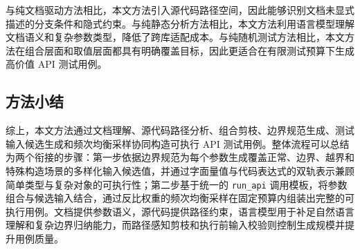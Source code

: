 \documentclass[UTF8,fontset=fandol]{ctexart}
\begin{document}
与纯文档驱动方法相比，本文方法引入源代码路径空间，因此能够识别文档未显式描述的分支条件和隐式约束。与纯静态分析方法相比，本文方法利用语言模型理解文档语义和复杂参数类型，降低了跨库适配成本。与纯随机测试方法相比，本文方法在组合层面和取值层面都具有明确覆盖目标，因此更适合在有限测试预算下生成高价值 API 测试用例。

\subsection{方法小结}

综上，本文方法通过文档理解、源代码路径分析、组合剪枝、边界规范生成、测试输入候选生成和频次均衡采样协同构造可执行 API 测试用例。整体流程可以总结为两个衔接的步骤：第一步依据边界规范为每个参数生成覆盖正常、边界、越界和特殊构造场景的多样化输入候选值，并通过字面量值与代码表达式的双轨表示兼顾简单类型与复杂对象的可执行性；第二步基于统一的 \texttt{run\_api} 调用模板，将参数组合与候选输入结合，通过反比权重的频次均衡采样在固定预算内组装出完整的可执行用例。文档提供参数语义，源代码提供路径约束，语言模型用于补足自然语言理解和复杂边界归纳能力，而路径感知剪枝和执行前输入校验则控制生成规模并提升用例质量。
\end{document}
